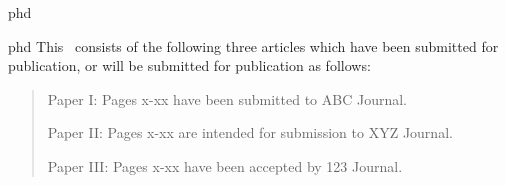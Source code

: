 \documentclass[times,12pt,titlepage]{mstogs}
\begin{document}

\begin{ThesisTitlePage}{phd}

\author{\MakeUppercase{Full Legal Name}}







\end{ThesisTitlePage}




\begin{ThesisPublicationOption}{phd}
  This \ThesisDissertationType\ consists of the following three
  articles which have been submitted for publication, or will be
  submitted for publication as follows:
\begin{quote}\begin{description}
\item Paper I: Pages x-xx have been submitted to ABC Journal.
\item Paper II: Pages x-xx are intended for submission to XYZ Journal.
\item Paper III: Pages x-xx have been accepted by 123 Journal.
\end{description}\end{quote}

\end{ThesisPublicationOption}


\begin{ThesisAbstract}
\lipsum[1]
\end{ThesisAbstract}

\end{document}
